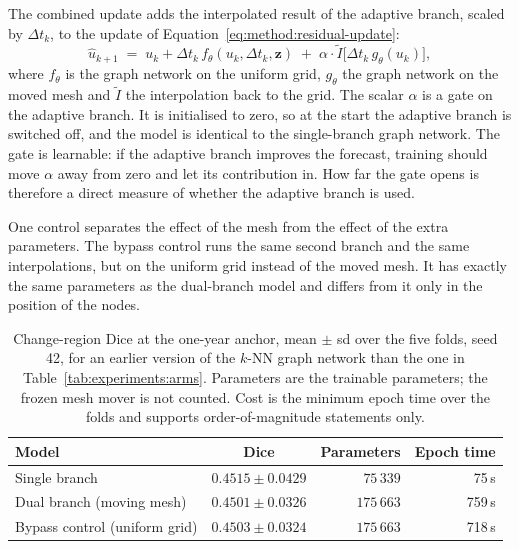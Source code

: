 The combined update adds the interpolated result of the adaptive branch,
scaled by $\Delta t_k$, to the update of
Equation~\eqref{eq:method:residual-update}:
\begin{equation}
  \hat u_{k+1} \;=\; u_k + \Delta t_k\, f_\theta(u_k, \Delta t_k, \mathbf{z})
  \;+\; \alpha \cdot \tilde I\big[\Delta t_k\, g_\theta(u_k)\big],
  \label{eq:experiments:dual}
\end{equation}
where $f_\theta$ is the graph network on the uniform grid, $g_\theta$ the
graph network on the moved mesh and $\tilde I$ the interpolation back to
the grid. The scalar $\alpha$ is a gate on the adaptive branch. It is
initialised to zero, so at the start the adaptive branch is switched off,
and the model is identical to the single-branch graph network. The gate is
learnable: if the adaptive branch improves the forecast, training should
move $\alpha$ away from zero and let its contribution in. How far the gate
opens is therefore a direct measure of whether the adaptive branch is used.

One control separates the effect of the mesh from the effect of the extra
parameters. The bypass control runs the same second branch and the same
interpolations, but on the uniform grid instead of the moved mesh. It has
exactly the same parameters as the dual-branch model and differs from it
only in the position of the nodes.

\begin{table}[t]
  \centering
  \caption[Single branch, dual branch and bypass control.]{%
    Change-region Dice at the one-year anchor, mean $\pm$ sd over the five
    folds, seed 42, for an earlier version of the $k$-NN graph network than
    the one in Table~\ref{tab:experiments:arms}. Parameters are the
    trainable parameters; the frozen mesh mover is not counted. Cost is the
    minimum epoch time over the folds and supports order-of-magnitude
    statements only.}
  \label{tab:experiments:mesh}
  \small
  \begin{tabular}{l c r r}
    \toprule
    Model & Dice & Parameters & Epoch time \\
    \midrule
    Single branch & $0.4515 \pm 0.0429$ & $75\,339$ & 75\,s \\
    Dual branch (moving mesh) & $0.4501 \pm 0.0326$ & $175\,663$ & 759\,s \\
    Bypass control (uniform grid) & $0.4503 \pm 0.0324$ & $175\,663$ & 718\,s \\
    \bottomrule
  \end{tabular}
\end{table}


